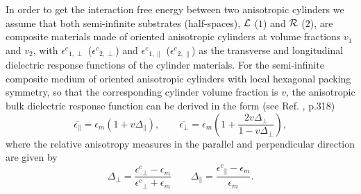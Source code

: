\documentclass[onecolumn,letterpaper,amsmath,amssymb,floatfix,aps,superscriptaddress]{revtex4}
\begin{document}
In order to get the interaction free energy between two anisotropic cylinders we assume that both semi-infinite substrates (half-spaces), ${\cal L}$ ($1$) and ${\cal R}$ ($2$), are 
composite materials made of oriented anisotropic cylinders at volume fractions $v_1$ and $v_2$, with ${\epsilon^{c}}_{1,\perp}$ (${\epsilon^{c}}_{2,\perp}$) 
and ${\epsilon^{c}}_{1,\parallel}$ (${\epsilon^{c}}_{2,\parallel}$) as the transverse and longitudinal
dielectric response functions of the cylinder materials. For the semi-infinite composite medium of oriented anisotropic cylinders with local hexagonal  packing symmetry, so that the corresponding cylinder volume fraction is $v$, the anisotropic bulk dielectric response function can be derived in the
form (see Ref. , p.318) 
\begin{equation}
\overline{\epsilon_{\parallel}}=\epsilon_{m}\left(1+v\Delta_{\parallel}\right),\qquad\overline{\epsilon_{\perp}}=\epsilon_{m}\left(1+\frac{2v\Delta_{\perp}}{1-v\Delta_{\perp}}\right),\label{eq:v_dependance}
\end{equation}
where the relative anisotropy measures in the parallel and perpendicular direction are given by
\begin{equation}
\Delta_{\perp}=\frac{{\epsilon^{c}}_{\perp}-\epsilon_{m}}{{\epsilon^{c}}_{\perp}+\epsilon_{m}}\qquad\Delta_{\parallel}=\frac{{\epsilon^{c}}_{\parallel}-\epsilon_{m}}{\epsilon_{m}}.
\label{anisoind}
\end{equation}
\end{document}
